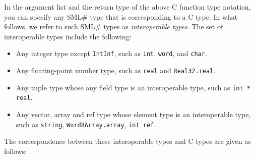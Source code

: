 \documentclass{jbook}
\newcommand{\smlsharp}{SML\#}
\begin{document}
	In the argument list and the return type of the above C function type
notation, you can specify any \smlsharp{} type that is corresponding to a C type.
	In what follows, we refer to such \smlsharp{} types as {\em interoperable types}.
	The set of interoperable types include the following:
\begin{itemize}
\item Any integer type except {\tt IntInf}, such as {\tt int}, {\tt word}, 
and {\tt char}.
\item Any floating-point number type, such as {\tt real} and {\tt Real32.real}.
\item Any tuple type whose any field type is an interoperable type, such as
{\tt int * real}.
\item Any vector, array and ref type whose element type is an interoperable
type, such as {\tt string}, {\tt Word8Array.array}, {\tt int ref}.
\end{itemize}
	The correspondence between these interoperable types and
C types are given as follows:
\end{document}
